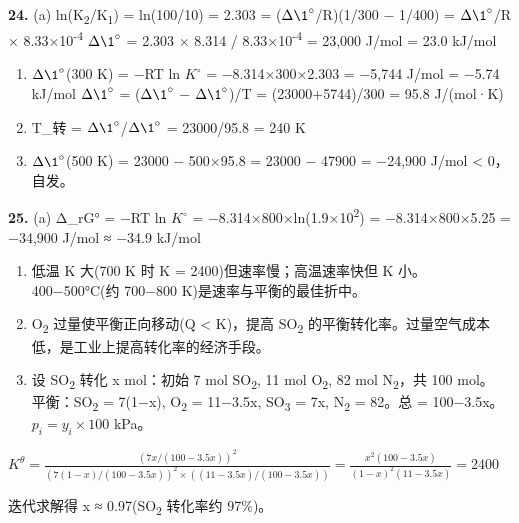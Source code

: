 \textbf{24.}
(a) ln(K\textsubscript{2}/K\textsubscript{1}) = ln(100/10) = 2.303 = (\(\Delta \1^{\circ}\)/R)(1/300 − 1/400) = \(\Delta \1^{\circ}\)/R × 8.33×10\textsuperscript{-4}
\(\Delta \1^{\circ}\) = 2.303 × 8.314 / 8.33×10\textsuperscript{-4} = 23,000 J/mol = 23.0 kJ/mol

\begin{enumerate}
\def\labelenumi{(\alph{enumi})}
\setcounter{enumi}{1}
\item
  \(\Delta \1^{\circ}\)(300 K) = −RT ln \(K^{\circ}\) = −8.314×300×2.303 = −5,744 J/mol = −5.74 kJ/mol
  \(\Delta \1^{\circ}\) = (\(\Delta \1^{\circ}\) − \(\Delta \1^{\circ}\))/T = (23000+5744)/300 = 95.8 J/(mol·K)
\item
  T\_转 = \(\Delta \1^{\circ}\)/\(\Delta \1^{\circ}\) = 23000/95.8 = 240 K
\item
  \(\Delta \1^{\circ}\)(500 K) = 23000 − 500×95.8 = 23000 − 47900 = −24,900 J/mol \textless{} 0，自发。
\end{enumerate}

\textbf{25.}
(a) Δ\_rG° = −RT ln \(K^{\circ}\) = −8.314×800×ln(1.9×10\textsuperscript{2}) = −8.314×800×5.25 = −34,900 J/mol ≈ −34.9 kJ/mol

\begin{enumerate}
\def\labelenumi{(\alph{enumi})}
\setcounter{enumi}{1}
\item
  低温 K 大(700 K 时 K = 2400)但速率慢；高温速率快但 K 小。400−500°C(约 700−800 K)是速率与平衡的最佳折中。
\item
  O\textsubscript{2} 过量使平衡正向移动(Q \textless{} K)，提高 SO\textsubscript{2} 的平衡转化率。过量空气成本低，是工业上提高转化率的经济手段。
\item
  设 SO\textsubscript{2} 转化 x mol：初始 7 mol SO\textsubscript{2}, 11 mol O\textsubscript{2}, 82 mol N\textsubscript{2}，共 100 mol。
  平衡：SO\textsubscript{2} = 7(1−x), O\textsubscript{2} = 11−3.5x, SO\textsubscript{3} = 7x, N\textsubscript{2} = 82。总 = 100−3.5x。
  \(p_i = y_i \times 100\) kPa。
\end{enumerate}

\(K^\theta = \frac{(7x/(100-3.5x))^2}{(7(1-x)/(100-3.5x))^2 \times ((11-3.5x)/(100-3.5x))} = \frac{x^2(100-3.5x)}{(1-x)^2(11-3.5x)} = 2400\)

迭代求解得 x ≈ 0.97(SO\textsubscript{2} 转化率约 97\%)。

